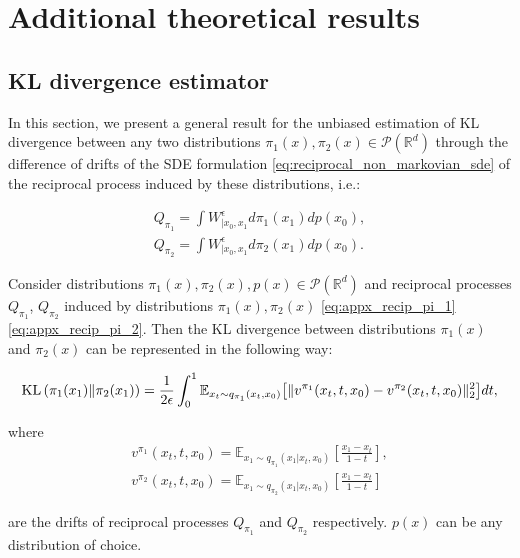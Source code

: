 \section{Additional theoretical results}

\subsection{KL divergence estimator}
\label{appendix:KL_estimator}

In this section, we present a general result for the unbiased estimation of KL divergence between any two distributions $\pi_1(x), \pi_2(x) \in \mathcal{P}(\mathbb{R}^d)$ through the difference of drifts of the SDE formulation \eqref{eq:reciprocal_non_markovian_sde} of the reciprocal process induced by these distributions, i.e.:

\begin{gather}
    Q_{\pi_1} = \int W^\epsilon_{|x_0, x_1}d\pi_1(x_1)dp(x_0), \label{eq:appx_recip_pi_1}
    \\
    Q_{\pi_2} = \int W^\epsilon_{|x_0, x_1}d\pi_2(x_1)dp(x_0).  \label{eq:appx_recip_pi_2}
\end{gather}

\begin{theorem} \label{th:general_kl}
    Consider distributions $\pi_1(x), \pi_2(x), p(x) \in \mathcal{P}(\mathbb{R}^d)$ and reciprocal processes $Q_{\pi_1}$, $Q_{\pi_2}$ induced by distributions $\pi_1(x), \pi_2(x)$ \eqref{eq:appx_recip_pi_1} \eqref{eq:appx_recip_pi_2}. Then the KL divergence between distributions $\pi_1(x)$ and $\pi_2(x)$ can be represented in the following way:
    
    \vspace{-5mm}
    \begin{gather}
        \mathrm{KL}\left(\pi_1(x_1) \middle\Vert \pi_2(x_1)\right) 
        = \frac{1}{2\epsilon} \int_{0}^{1} \mathbb{E}_{x_t \sim q_{\pi_1}(x_t, x_0) }\big[ \Vert v^{\pi_1}(x_t, t, x_0) - v^{\pi_2}(x_t, t, x_0) \Vert_2^2 \big] dt, \label{eq:kl_general_appx} 
    \end{gather}
    \vspace{-3mm}

    where
    \vspace{-5mm}
    \begin{gather}
        v^{\pi_1}(x_t, t, x_0) = \mathbb{E}_{x_1 \sim q_{\pi_1}(x_1|x_t, x_0)}\left[\frac{x_1 - x_t}{1 - t}\right], \\
        v^{\pi_2}(x_t, t, x_0) = \mathbb{E}_{x_1 \sim q_{\pi_2}(x_1|x_t, x_0)}\left[\frac{x_1 - x_t}{1 - t}\right]
    \end{gather}

    are the drifts of reciprocal processes  $Q_{\pi_1}$ and $Q_{\pi_2}$ respectively. $p(x)$ can be any distribution of choice.
    
\end{theorem}

